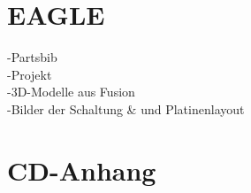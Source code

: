 
\newpage
\appendix
\section{EAGLE}
\label{ap-test}
-Partsbib\\
-Projekt\\
-3D-Modelle aus Fusion\\
-Bilder der Schaltung \& und Platinenlayout\\
\section{CD-Anhang}